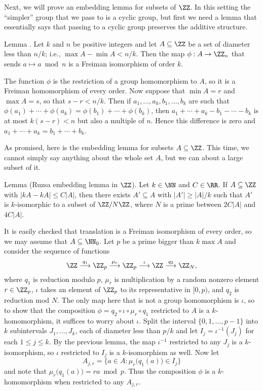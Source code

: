 Next, we will prove an embedding lemma for subsets of $\ZZ$. In this setting the ``simpler'' group
that we pass to is a cyclic group, but first we need a lemma that essentially says that passing
to a cyclic group preserves the additive structure.

\proclaim Lemma {\advthm}. Let $k$ and $n$ be positive integers and let $A\subseteq \ZZ$ be a set of
diameter less than $n/k$; i.e., $\max A - \min A < n/k$. Then the map $\phi : A\to \ZZ_n$ that
sends $a\mapsto a\bmod n$ is a Freiman isomorphism of order $k$.

\proof The function $\phi$ is the restriction of a group homomorphism to $A$, so it is a Freiman
homomorphism of every order. Now suppose that $\min A = r$ and $\max A = s$, so that $s-r < n/k$.
Then if $a_1,\ldots,a_k,b_1,\ldots,b_k$ are such that $\phi(a_1)+\cdots+\phi(a_k) = \phi(b_1)+\cdots+\phi(b_k)$,
then $a_1+\cdots+a_k -b_1-\cdots-b_k$ is at most $k(s-r) < n$ but also a multiple of $n$.
Hence this difference is zero and $a_1 + \cdots + a_k = b_1+\cdots+b_k$.\slug

As promised, here is the embedding lemma for subsets $A\subseteq \ZZ$. This time, we cannot simply
say anything about the whole set $A$, but we can about a large subset of it.

\parenproclaim Lemma {\advthm} (Ruzsa embedding lemma in $\ZZ$). Let $k\in \NN$ and $C\in \RR$.
If $A\subseteq \ZZ$ with $|kA-kA|\le C|A|$, then there exists $A'\subseteq A$ with $|A'|\ge |A|/k$
such that $A'$ is $k$-isomorphic to a subset of $\ZZ/N\ZZ$, where $N$ is a prime between
$2C|A|$ and $4C|A|$.\slug

\proof It is easily checked that translation is a Freiman isomorphism of every order, so we may assume
that $A\subseteq \NN_0$. Let $p$ be a prime bigger than $k\max A$ and consider the
sequence of functions
$$\ZZ \buildrel{q_1}\over\longrightarrow \ZZ_p \buildrel{\mu_r}\over\longrightarrow \ZZ_p
\buildrel\iota\over\longrightarrow \ZZ \buildrel{q_2}\over\longrightarrow \ZZ_N,$$
where $q_1$ is reduction modulo $p$, $\mu_r$ is multiplication by a random nonzero element $r\in \ZZ_p$,
$\iota$ takes an element of $\ZZ_p$ to its representative in $[0,p)$, and $q_2$ is reduction mod $N$.
The only map here that is not a group homomorphism is $\iota$, so to show that the composition
$\phi = q_2\circ \iota\circ \mu_r\circ q_1$ restricted to $A$ is a $k$-homomorphism, it suffices to worry
about $\iota$. Split the interval $\{0,1,\ldots,p-1\}$ into $k$ subintervals $J_1,\ldots,J_k$,
each of diameter less than $p/k$ and let $I_j = \iota^{-1}(J_j)$ for each $1\le j\le k$. By the previous
lemma, the map $\iota^{-1}$ restricted to any $J_j$ is a $k$-isomorphism, so $\iota$ restricted
to $I_j$ is a $k$-isomorphism as well. Now let
$$A_{j,r} = \bigl\{a\in A : \mu_r\bigl(q_1(a)\bigr) \in I_j\bigr\}$$
and note that $\mu_r\bigl(q_1(a)\bigr) = ra \bmod p$. Thus the composition $\phi$ is a $k$-homomorph\-ism
when restricted to any $A_{j,r}$.

